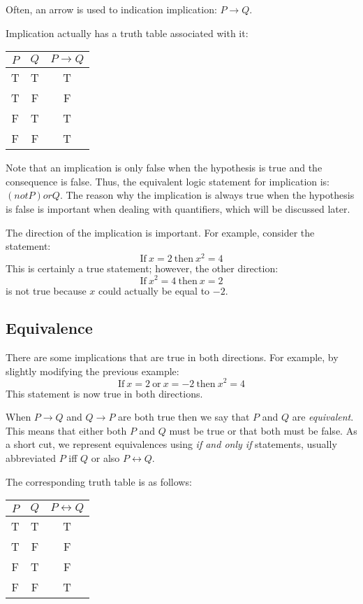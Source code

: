 \documentclass[letterpaper,12pt,fleqn]{article}
\begin{document}
Often, an arrow is used to indication implication: $P\rightarrow Q$.

Implication actually has a truth table associated with it:

\begin{tabular}{|cc|c|}
\hline
$P$ & $Q$ & $P\to Q$ \\
\hline
T & T & T \\
\hline
T & F & F \\
\hline
F & T & T \\
\hline
F & F & T \\
\hline
\end{tabular}

Note that an implication is only false when the hypothesis is true and the
consequence is false. Thus, the equivalent logic statement for implication is:
$(not P) or Q$. The reason why the implication is always true when the
hypothesis is false is important when dealing with quantifiers, which will be
discussed later.

The direction of the implication is important. For example, consider the
statement:
\[\mbox{If}\ x=2\ \mbox{then}\ x^2=4\]
This is certainly a true statement; however, the other direction:
\[\mbox{If}\ x^2=4\ \mbox{then}\ x=2\]
is not true because $x$ could actually be equal to $-2$.

\subsection*{Equivalence}

There are some implications that are true in both directions. For example, by
slightly modifying the previous example:
\[\mbox{If}\ x=2\ \mbox{or}\ x=-2\ \mbox{then}\ x^2=4\]
This statement is now true in both directions.

When $P\rightarrow Q$ and $Q\rightarrow P$ are both
true then we say that $P$ and $Q$ are \emph{equivalent}. This means that either
both $P$ and $Q$ must be true or that both must be false. As a short cut, we
represent equivalences using \emph{if and only if} statements, usually
abbreviated $P$ iff $Q$ or also $P\leftrightarrow Q$.

The corresponding truth table is as follows:

\begin{tabular}{|cc|c|}
\hline
$P$ & $Q$ & $P\leftrightarrow Q$ \\
\hline
T & T & T \\
\hline
T & F & F \\
\hline
F & T & F \\
\hline
F & F & T \\
\hline
\end{tabular}
\end{document}
